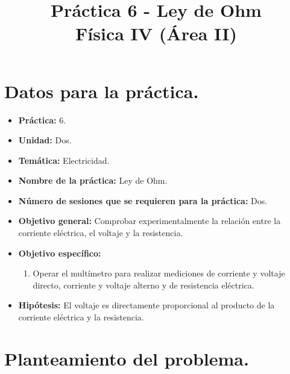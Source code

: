 \documentclass[14pt]{extarticle}
\title{\vspace*{-2cm} Práctica 6 - Ley de Ohm\\  Física IV (Área II) \vspace{-5ex}}
\date{}
\begin{document}
\maketitle

\section{Datos para la práctica.}

\begin{itemize}
\itemsep0em 
\item  \textbf{Práctica:} 6.
\item \textbf{Unidad:} Dos.
\item \textbf{Temática:} Electricidad.
\item \textbf{Nombre de la práctica:} Ley de Ohm.
\item \textbf{Número de sesiones que se requieren para la práctica:} Dos.
\item \textbf{Objetivo general: } Comprobar experimentalmente la relación entre la corriente eléctrica, el voltaje y la resistencia.
\item \textbf{Objetivo específico: }
\begin{enumerate}
\item Operar el multímetro para realizar mediciones de corriente y voltaje directo, corriente y voltaje alterno y de resistencia eléctrica.
\end{enumerate}
\item \textbf{Hipótesis: } El voltaje es directamente proporcional al producto de la corriente eléctrica y la resistencia. 
\end{itemize}

\section{Planteamiento del problema.} 
\end{document}

